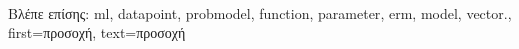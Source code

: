 {{%
		\\
		\foreignlanguage{greek}{Βλέπε επίσης:} \gls{ml}, \gls{datapoint}, \gls{probmodel}, \gls{function}, \gls{parameter}, \gls{erm}, \gls{model}, \gls{vector}.},
	first={\foreignlanguage{greek}{προσοχή}},
	text={\foreignlanguage{greek}{προσοχή}}
}

